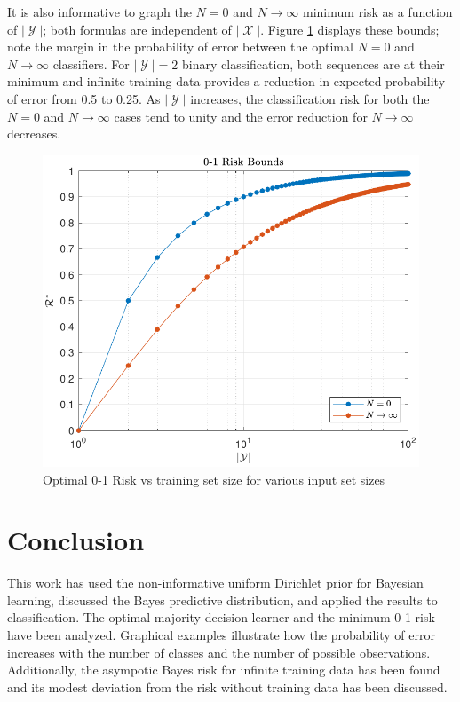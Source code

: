 \documentclass[conference]{IEEEtran}
\DeclareMathOperator{\Xcal}{\mathcal{X}}
\DeclareMathOperator{\Ycal}{\mathcal{Y}}
\begin{document}
It is also informative to graph the $N=0$ and $N \to \infty$ minimum risk as a function of $|\Ycal|$; both formulas are independent of $|\Xcal|$. Figure \ref{fig:Risk_01_uni_N_bounds} displays these bounds; note the margin in the probability of error between the optimal $N=0$ and $N \to \infty$ classifiers. For $|\Ycal| = 2$ binary classification, both sequences are at their minimum and infinite training data provides a reduction in expected probability of error from 0.5 to 0.25. As $|\Ycal|$ increases, the classification risk for both the $N=0$ and $N \to \infty$ cases tend to unity and the error reduction for $N \to \infty$ decreases. 

\begin{figure}
\centering
\includegraphics[width=0.9\linewidth]{Risk_01_uni_N_bounds.pdf}
\caption{Optimal 0-1 Risk vs training set size for various input set sizes}
\label{fig:Risk_01_uni_N_bounds}
\end{figure}






\section{Conclusion}

This work has used the non-informative uniform Dirichlet prior for Bayesian learning, discussed the Bayes predictive distribution, and applied the results to classification. The optimal majority decision learner and the minimum 0-1 risk have been analyzed. Graphical examples illustrate how the probability of error increases with the number of classes and the number of possible observations. Additionally, the asympotic Bayes risk for infinite training data has been found and its modest deviation from the risk without training data has been discussed. 
\end{document}
